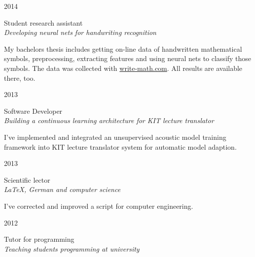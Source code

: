 \documentclass[a4paper,10pt]{article} %
\begin{document}
{\begin{minipage}[t]{0.5\textwidth}

{\raggedleft\textsc{2014}\par}

{\raggedright\large Student research assistant\\
\textit{Developing neural nets for handwriting recognition}\\[5pt]}

\normalsize{My bachelors thesis includes getting on-line data of handwritten
mathematical symbols, preprocessing, extracting features and using neural nets
to classify those symbols. The data was collected with \href{http://write-math.com}{write-math.com}. All results are available there, too.}\\


{\raggedleft\textsc{2013}\par}

{\raggedright\large Software Developer\\
\textit{Building a continuous learning architecture for KIT lecture translator}\\[5pt]}

\normalsize{I've implemented and integrated an unsupervised acoustic model training framework into KIT lecture translator system for automatic model adaption.}\\


{\raggedleft\textsc{2013}\par}

{\raggedright\large Scientific lector\\
\textit{\LaTeX{}, German and computer science}\\[5pt]}

\normalsize{I've corrected and improved a script for computer engineering.}\\


{\raggedleft\textsc{2012}\par}

{\raggedright\large Tutor for programming\\
\textit{Teaching students programming at university}\\[5pt]}


\end{minipage}}
\end{document}
